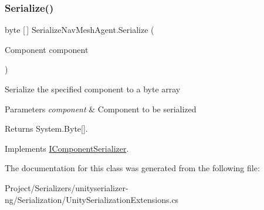 \subsubsection{\texorpdfstring{Serialize()}{Serialize()}}
{\footnotesize\ttfamily byte \mbox{[}$\,$\mbox{]} Serialize\+Nav\+Mesh\+Agent.\+Serialize (\begin{DoxyParamCaption}\item[{Component}]{component }\end{DoxyParamCaption})\hspace{0.3cm}{\ttfamily [inline]}}



Serialize the specified component to a byte array 


\begin{DoxyParams}{Parameters}
{\em component} & Component to be serialized\\
\hline
\end{DoxyParams}
\begin{DoxyReturn}{Returns}
System.\+Byte\mbox{[}\mbox{]}.
\end{DoxyReturn}


Implements \hyperlink{interface_i_component_serializer_ab2aa38005665496b62d6c54b5f0dbd31}{I\+Component\+Serializer}.



The documentation for this class was generated from the following file\+:\begin{DoxyCompactItemize}
\item 
Project/\+Serializers/unityserializer-\/ng/\+Serialization/Unity\+Serialization\+Extensions.\+cs\end{DoxyCompactItemize}
